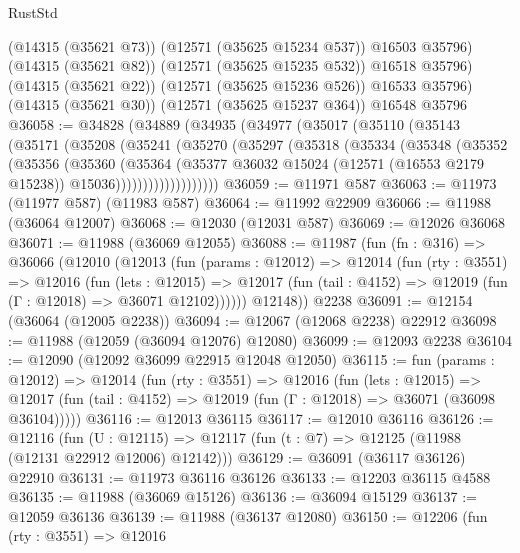 \begin{lexlean}{RustStd}
\begin{coremodule}
          (@14315 (@35621 @73))
          (@12571 (@35625 @15234 @537))
          @16503
          @35796)
        (@14315 (@35621 @82))
        (@12571 (@35625 @15235 @532))
        @16518
        @35796)
      (@14315 (@35621 @22))
      (@12571 (@35625 @15236 @526))
      @16533
      @35796)
    (@14315 (@35621 @30))
    (@12571 (@35625 @15237 @364))
    @16548
    @35796
@36058 := @34828
    (@34889
      (@34935
        (@34977
          (@35017
            (@35110
              (@35143
                (@35171
                  (@35208
                    (@35241
                      (@35270
                        (@35297
                          (@35318
                            (@35334
                              (@35348
                                (@35352
                                  (@35356
                                    (@35360
                                      (@35364
                                        (@35377
                                          @36032
                                          @15024
                                          (@12571 (@16553 @2179 @15238))
                                          @15036)))))))))))))))))))
@36059 := @11971 @587
@36063 := @11973 (@11977 @587) (@11983 @587)
@36064 := @11992 @22909
@36066 := @11988 (@36064 @12007)
@36068 := @12030 (@12031 @587)
@36069 := @12026 @36068
@36071 := @11988 (@36069 @12055)
@36088 := @11987
    (fun (fn : @316) =>
    @36066
      (@12010
        (@12013
          (fun (params : @12012) =>
          @12014
            (fun (rty : @3551) =>
            @12016
              (fun (lets : @12015) =>
              @12017 (fun (tail : @4152) => @12019 (fun (Γ : @12018) => @36071 @12102))))))
        @12148))
    @2238
@36091 := @12154 (@36064 (@12005 @2238))
@36094 := @12067 (@12068 @2238) @22912
@36098 := @11988 (@12059 (@36094 @12076) @12080)
@36099 := @12093 @2238
@36104 := @12090 (@12092 @36099 @22915 @12048 @12050)
@36115 := fun (params : @12012) =>
  @12014
    (fun (rty : @3551) =>
    @12016
      (fun (lets : @12015) =>
      @12017 (fun (tail : @4152) => @12019 (fun (Γ : @12018) => @36071 (@36098 @36104)))))
@36116 := @12013 @36115
@36117 := @12010 @36116
@36126 := @12116
    (fun (U : @12115) => @12117 (fun (t : @7) => @12125 (@11988 (@12131 @22912 @12006) @12142)))
@36129 := @36091 (@36117 @36126) @22910
@36131 := @11973 @36116 @36126
@36133 := @12203 @36115 @4588
@36135 := @11988 (@36069 @15126)
@36136 := @36094 @15129
@36137 := @12059 @36136
@36139 := @11988 (@36137 @12080)
@36150 := @12206
    (fun (rty : @3551) =>
    @12016

\end{coremodule}
\end{lexlean}
